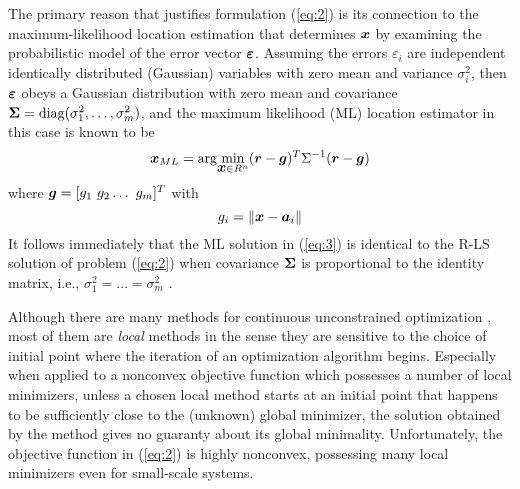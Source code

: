 The primary reason that justifies formulation (\ref{eq:2}) is its connection to the maximum-likelihood location estimation that determines $\mbox{\boldmath$x$}$ by examining the probabilistic model of the error vector $\mbox{\boldmath${\varepsilon}$}$. Assuming the errors $\varepsilon_i$ are independent identically distributed (Gaussian) variables with zero mean and variance $\sigma_i^2$, then $\mbox{\boldmath${\varepsilon}$}$ obeys a Gaussian distribution with zero mean and covariance $\mbox{\boldmath${\Sigma}$} = \mbox{diag}(\sigma_1^2, \ldots, \sigma_m^2)$, and the maximum likelihood (ML) location estimator in this case is known to be
\begin{equation} \label{eq:3}%
\Bx_{ML} = \mbox{arg}\!\min_{{\Bx} \in R^n} (\Br - \Bg)^T\Sigma^{-1}(\Br - \Bg)
\end{equation}
where $\mbox{\boldmath$g$} = [g_1 \ g_2 \ldots \ g_m]^T$ with
\begin{equation} \label{eq:4}%
g_i = \|{\Bx} - {\Ba}_i\|
\end{equation}
It follows immediately that the ML solution in (\ref{eq:3}) is identical to the R-LS solution of problem (\ref{eq:2}) when covariance $\mbox{\boldmath${\Sigma}$}$ is proportional to the identity matrix, i.e., $\sigma_1^2=\ldots =\sigma_m^2$ .

Although there are many methods for continuous unconstrained optimization \cite{AntonLu}, most of them are \textit{local} methods in the sense they are sensitive to the choice of initial point where the iteration of an optimization algorithm begins. Especially when applied to a nonconvex objective function which possesses a number of local minimizers, unless a chosen local method starts at an initial point that happens to be sufficiently close to the (unknown) global minimizer, the solution obtained by the method gives no guaranty about its global minimality. Unfortunately, the objective function in (\ref{eq:2}) is highly nonconvex, possessing many local minimizers even for small-scale systems.

